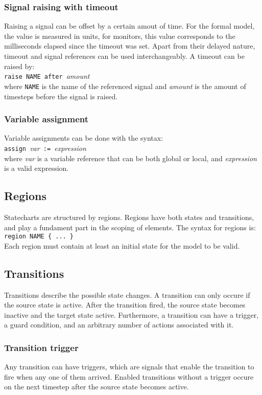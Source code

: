 {  \subsubsection{Signal raising with timeout}
Raising a signal can be offset by a certain amout of time. For the formal model, the value is measured in units, for monitors, this value corresponds to the milliseconds elapsed since the timeout was set. Apart from their delayed nature, timeout and signal references can be used interchangeably. A timeout can be raised by: \\\verb!raise NAME after !\textit{amount}\\ where \verb!NAME! is the name of the referenced signal and \textit{amount} is the amount of timesteps before the signal is raised.
  \subsubsection{Variable assignment}
Variable assignments can be done with the syntax: \\\verb!assign !\textit{var}\verb! := !\textit{expression}\\ where \textit{var} is a variable reference that can be both global or local, and \textit{expression} is a valid expression.
  \subsection{Regions}
Statecharts are structured by regions. Regions have both states and transitions, and play a fundament part in the scoping of elements. The syntax for regions is: \\\verb!region NAME { ... }!\\ Each region must contain at least an initial state for the model to be valid.
  \subsection{Transitions}
Transitions describe the possible state changes. A transition can only occure if the source state is active. After the transition fired, the source state becomes inactive and the target state active. Furthermore, a transition can have a trigger, a guard condition, and an arbitrary number of actions associated with it.
    \subsubsection{Transition trigger}
Any transition can have triggers, which are signals that enable the transition to fire when any one of them arrived. Enabled transitions without a trigger occure on the next timestep after the source state becomes active.
}
